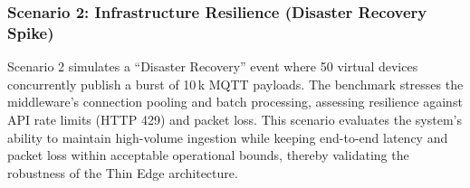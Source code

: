 \subsubsection{Scenario 2: Infrastructure Resilience (Disaster Recovery Spike)}
Scenario 2 simulates a “Disaster Recovery” event where 50 virtual devices concurrently publish a burst of 10\,k MQTT payloads. The benchmark stresses the middleware’s connection pooling and batch processing, assessing resilience against API rate limits (HTTP 429) and packet loss. This scenario evaluates the system's ability to maintain high-volume ingestion while keeping end-to-end latency and packet loss within acceptable operational bounds, thereby validating the robustness of the Thin Edge architecture.
